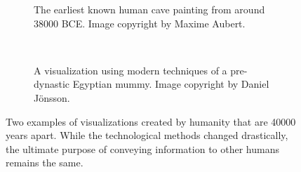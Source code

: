 \begin{figure}
  \centering
  \begin{subfigure}{\abtwoimagewidth}
    \caption{The earliest known human cave painting from around 38000 BCE. Image copyright by Maxime Aubert.}
    \label{fig:motivation:vis:cave}
  \end{subfigure}
  ~
  \begin{subfigure}{\abtwoimagewidth}
    \caption{A visualization using modern techniques of a pre-dynastic Egyptian mummy. Image copyright by Daniel J\"onsson.}
    \label{fig:motivation:vis:modern}
  \end{subfigure}
  \caption{Two examples of visualizations created by humanity that are 40000 years apart.  While the technological methods changed drastically, the ultimate purpose of conveying information to other humans remains the same.}
  \label{fig:motivation:vis}
\end{figure}

